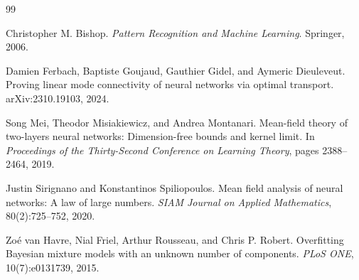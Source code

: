 \documentclass[11pt]{article}
\theoremstyle{definition}
\begin{document}
\begin{thebibliography}{99}

Christopher M. Bishop.
\newblock \emph{Pattern Recognition and Machine Learning}.
\newblock Springer, 2006.

Damien Ferbach, Baptiste Goujaud, Gauthier Gidel, and Aymeric Dieuleveut.
\newblock Proving linear mode connectivity of neural networks via optimal
transport.
\newblock arXiv:2310.19103, 2024.

Song Mei, Theodor Misiakiewicz, and Andrea Montanari.
\newblock Mean-field theory of two-layers neural networks: Dimension-free
bounds and kernel limit.
\newblock In \emph{Proceedings of the Thirty-Second Conference on Learning
Theory}, pages 2388--2464, 2019.

Justin Sirignano and Konstantinos Spiliopoulos.
\newblock Mean field analysis of neural networks: A law of large numbers.
\newblock \emph{SIAM Journal on Applied Mathematics}, 80(2):725--752, 2020.

Zo\'e van Havre, Nial Friel, Arthur Rousseau, and Chris P. Robert.
\newblock Overfitting Bayesian mixture models with an unknown number of
components.
\newblock \emph{PLoS ONE}, 10(7):e0131739, 2015.

\end{thebibliography}
\end{document}
